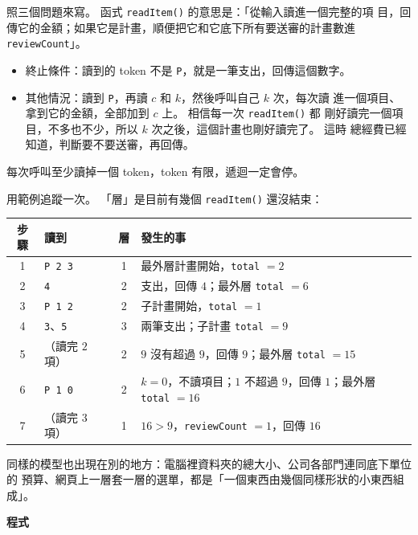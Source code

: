 照三個問題來寫。 函式 \texttt{readItem()} 的意思是：「從輸入讀進一個完整的項
目，回傳它的金額；如果它是計畫，順便把它和它底下所有要送審的計畫數進
\texttt{reviewCount}」。

\begin{itemize}
\item 終止條件：讀到的 token 不是 \texttt{P}，就是一筆支出，回傳這個數字。
\item 其他情況：讀到 \texttt{P}，再讀 $c$ 和 $k$，然後呼叫自己 $k$ 次，每次讀
進一個項目、拿到它的金額，全部加到 $c$ 上。 相信每一次 \texttt{readItem()} 都
剛好讀完一個項目，不多也不少，所以 $k$ 次之後，這個計畫也剛好讀完了。 這時
總經費已經知道，判斷要不要送審，再回傳。
\end{itemize}

每次呼叫至少讀掉一個 token，token 有限，遞迴一定會停。

用範例追蹤一次。 「層」是目前有幾個 \texttt{readItem()} 還沒結束：

\begin{center}
\small
\begin{tabular}{clcl}
\toprule
步驟 & 讀到 & 層 & 發生的事 \\
\midrule
1 & \texttt{P 2 3} & 1 & 最外層計畫開始，\texttt{total} $= 2$ \\
2 & \texttt{4} & 2 & 支出，回傳 $4$；最外層 \texttt{total} $= 6$ \\
3 & \texttt{P 1 2} & 2 & 子計畫開始，\texttt{total} $= 1$ \\
4 & \texttt{3}、\texttt{5} & 3 & 兩筆支出；子計畫 \texttt{total} $= 9$ \\
5 & （讀完 $2$ 項） & 2 & $9$ 沒有超過 $9$，回傳 $9$；最外層 \texttt{total} $= 15$ \\
6 & \texttt{P 1 0} & 2 & $k = 0$，不讀項目；$1$ 不超過 $9$，回傳 $1$；最外層 \texttt{total} $= 16$ \\
7 & （讀完 $3$ 項） & 1 & $16 > 9$，\texttt{reviewCount} $= 1$，回傳 $16$ \\
\bottomrule
\end{tabular}
\end{center}

同樣的模型也出現在別的地方：電腦裡資料夾的總大小、公司各部門連同底下單位的
預算、網頁上一層套一層的選單，都是「一個東西由幾個同樣形狀的小東西組成」。

\textbf{程式}

